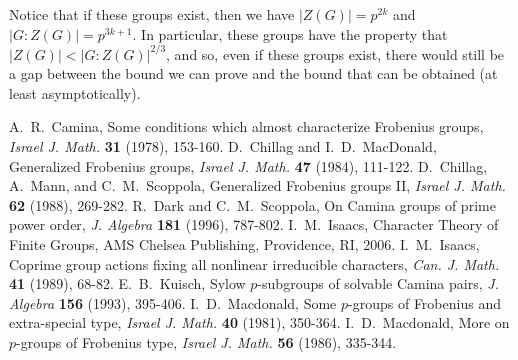 Notice that if these groups exist, then we have $|Z (G)| = p^{2k}$ and $|G:Z(G)| = p^{3k+1}$.  In particular, these groups have the property that $|Z (G)| < |G:Z (G)|^{2/3}$, and so, even if these groups exist, there would still be a gap between the bound we can prove and the bound that can be obtained (at least asymptotically).

\bigskip

\begin{thebibliography}{99}
  A.~R.~Camina, Some conditions which almost characterize Frobenius groups, {\it Israel J. Math.} {\bf 31} (1978), 153-160.
    D.~Chillag and I.~D.~MacDonald, Generalized                  Frobenius groups, {\it Israel J. Math.} {\bf 47} (1984), 111-122.
  D.~Chillag, A.~Mann, and C.~M.~Scoppola,
     Generalized Frobenius groups II, {\it Israel J. Math.} {\bf 62} (1988), 269-282.
    R.~Dark and C.~M.~Scoppola, On Camina groups of prime power order, {\it J. Algebra} {\bf 181} (1996),
    787-802.
    I.~M.~Isaacs, Character Theory of Finite Groups, AMS Chelsea Publishing, Providence, RI, 2006.
 I.~M.~Isaacs, Coprime group actions fixing all nonlinear irreducible characters, {\it Can. J. Math.} {\bf 41} (1989), 68-82.
   E.~B.~Kuisch, Sylow $p$-subgroups of solvable                  Camina pairs, {\it J. Algebra} {\bf 156} (1993), 395-406.
   I.~D.~Macdonald, Some $p$-groups of Frobenius and extra-special type, {\it Israel J. Math.} {\bf 40} (1981), 350-364.
    I.~D.~Macdonald, More on $p$-groups of Frobenius type, {\it Israel J. Math.} {\bf 56} (1986), 335-344.
\end{thebibliography}




